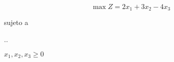 \documentclass[../main.tex]{subfiles}
\begin{document}


\begin{questions}
\question %

\[\max Z = 2x_1 + 3x_2 - 4x_3  \]

{\centering
sujeto a 

\sysdelim..%
%

\vspace{3mm}
$x_1, x_2, x_3\geq 0$
\par}





\end{questions}
\end{document}
